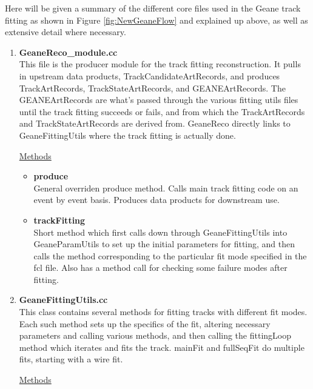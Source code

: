     Here will be given a summary of the different core files used in the Geane track fitting as shown in Figure \ref{fig:NewGeaneFlow} and explained up above, as well as extensive detail where necessary. 


    \begin{enumerate}

      \item{\bf{GeaneReco\_module.cc}} \\
      This file is the producer module for the track fitting reconstruction. It pulls in upstream data products, TrackCandidateArtRecords, and produces TrackArtRecords, TrackStateArtRecords, and GEANEArtRecords. The GEANEArtRecords are what's passed through the various fitting utils files until the track fitting succeeds or fails, and from which the TrackArtRecords and TrackStateArtRecords are derived from. GeaneReco directly links to GeaneFittingUtils where the track fitting is actually done.

      \underline{Methods}

        \begin{itemize}

          \item{\bf{produce}} \\
          General overriden produce method. Calls main track fitting code on an event by event basis. Produces data products for downstream use.

          \item{\bf{trackFitting}} \\ 
          Short method which first calls down through GeaneFittingUtils into GeaneParamUtils to set up the initial parameters for fitting, and then calls the method corresponding to the particular fit mode specified in the fcl file. Also has a method call for checking some failure modes after fitting.

        \end{itemize}

      \item{\bf{GeaneFittingUtils.cc}} \\
      \label{sec:GeaneFittingUtils}
      This class contains several methods for fitting tracks with different fit modes. Each such method sets up the specifics of the fit, altering necessary parameters and calling various methods, and then calling the fittingLoop method which iterates and fits the track. mainFit and fullSeqFit do multiple fits, starting with a wire fit. 

      \underline{Methods}


\end{enumerate}
